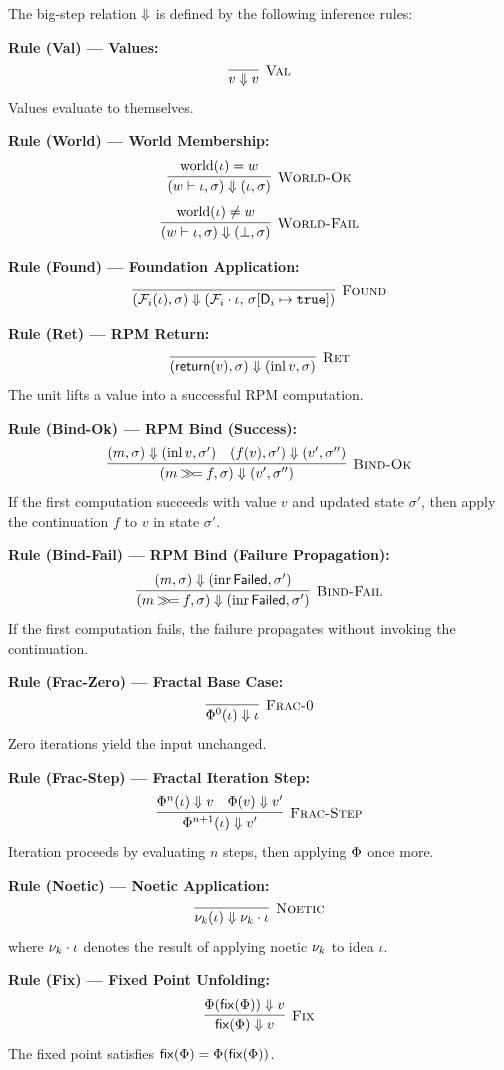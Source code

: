 \begin{definition}
\label{def:bigstep-rules}
The big-step relation $\Downarrow$ is defined by the following inference rules:

\medskip
\textbf{Rule (Val) --- Values:}
\[
\infer[\textsc{Val}]{v \bigstep v}{}
\]
Values evaluate to themselves.

\medskip
\textbf{Rule (World) --- World Membership:}
\[
\infer[\textsc{World-Ok}]{(w \vdash \iota, \sigma) \bigstep (\iota, \sigma)}{\mathrm{world}(\iota) = w}
\]
\[
\infer[\textsc{World-Fail}]{(w \vdash \iota, \sigma) \bigstep (\bot, \sigma)}{\mathrm{world}(\iota) \neq w}
\]

\medskip
\textbf{Rule (Found) --- Foundation Application:}
\[
\infer[\textsc{Found}]{(\Foundations_i(\iota), \sigma) \bigstep (\Foundations_i \cdot \iota,\, \sigma[\mathsf{D}_i \mapsto \mathtt{true}])}{}
\]

\medskip
\textbf{Rule (Ret) --- RPM Return:}
\[
\infer[\textsc{Ret}]{(\rpmret(v), \sigma) \bigstep (\mathrm{inl}\, v, \sigma)}{}
\]
The unit lifts a value into a successful RPM computation.

\medskip
\textbf{Rule (Bind-Ok) --- RPM Bind (Success):}
\[
\infer[\textsc{Bind-Ok}]{(m \rpmbind f, \sigma) \bigstep (v', \sigma'')}{%
    (m, \sigma) \bigstep (\mathrm{inl}\, v, \sigma') & (f(v), \sigma') \bigstep (v', \sigma'')}
\]
If the first computation succeeds with value $v$ and updated state $\sigma'$,
then apply the continuation $f$ to $v$ in state $\sigma'$.

\medskip
\textbf{Rule (Bind-Fail) --- RPM Bind (Failure Propagation):}
\[
\infer[\textsc{Bind-Fail}]{(m \rpmbind f, \sigma) \bigstep (\mathrm{inr}\,\Failed, \sigma')}{%
    (m, \sigma) \bigstep (\mathrm{inr}\,\Failed, \sigma')}
\]
If the first computation fails, the failure propagates without invoking the continuation.

\medskip
\textbf{Rule (Frac-Zero) --- Fractal Base Case:}
\[
\infer[\textsc{Frac-0}]{\Frac^0(\iota) \bigstep \iota}{}
\]
Zero iterations yield the input unchanged.

\medskip
\textbf{Rule (Frac-Step) --- Fractal Iteration Step:}
\[
\infer[\textsc{Frac-Step}]{\Frac^{n+1}(\iota) \bigstep v'}{%
    \Frac^n(\iota) \bigstep v & \Frac(v) \bigstep v'}
\]
Iteration proceeds by evaluating $n$ steps, then applying $\Phi$ once more.

\medskip
\textbf{Rule (Noetic) --- Noetic Application:}
\[
\infer[\textsc{Noetic}]{\noe{k}(\iota) \bigstep \noe{k} \cdot \iota}{}
\]
where $\nu_{k} \cdot \iota$ denotes the result of applying noetic $\nu_{k}$ to idea $\iota$.

\medskip
\textbf{Rule (Fix) --- Fixed Point Unfolding:}
\[
\infer[\textsc{Fix}]{\fix(\Frac) \bigstep v}{\Frac(\fix(\Frac)) \bigstep v}
\]
The fixed point satisfies $\mathsf{fix}(\Phi) = \Phi(\mathsf{fix}(\Phi))$.
\end{definition}

